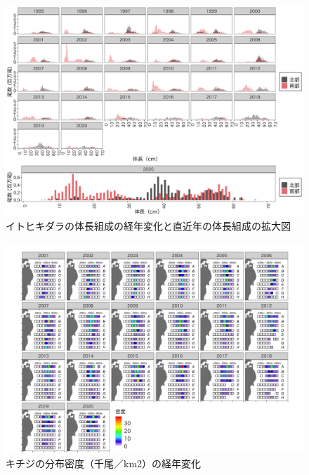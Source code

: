\documentclass[11pt]{article} %
\begin{document}
\begin{linenumbers}
\begin{figure}[h]
  \centering
  \includegraphics[width = 14cm]{イトヒキダラlength.png}
  \caption{イトヒキダラの体長組成の経年変化と直近年の体長組成の拡大図}
\end{figure}

\begin{figure}[h]
  \centering
  \includegraphics[width = 14cm]{キチジdens.png}
  \caption{キチジの分布密度（千尾／km2）の経年変化}
\end{figure}


\end{linenumbers}
\end{document}
